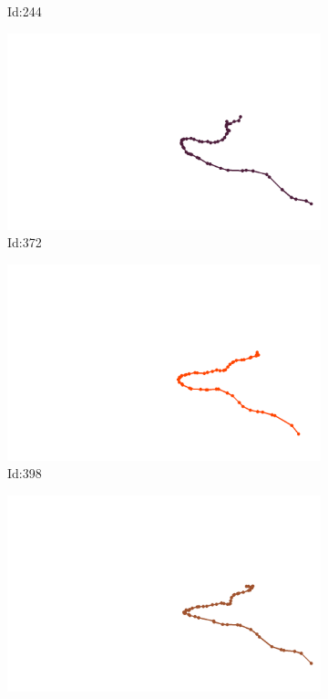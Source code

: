 \documentclass[12pt,twoside]{report}
\begin{document}
\begin{figure}
\begin{subfigure}[b]{0.20\textwidth}
\caption{Id:244}
\end{subfigure}
\begin{subfigure}[b]{0.20\textwidth}
\centering
\includegraphics[width=\textwidth]{../../trajectories/372.png}
\caption{Id:372}
\end{subfigure}
\begin{subfigure}[b]{0.20\textwidth}
\centering
\includegraphics[width=\textwidth]{../../trajectories/398.png}
\caption{Id:398}
\end{subfigure}
\begin{subfigure}[b]{0.20\textwidth}
\centering
\includegraphics[width=\textwidth]{../../trajectories/408.png}

\end{subfigure}
\end{figure}
\end{document}
